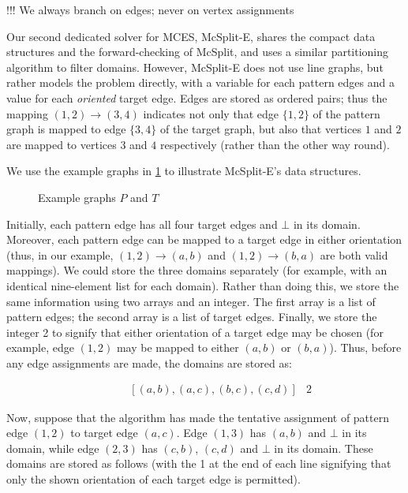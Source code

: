 !!! We always branch on edges; never on vertex assignments

Our second dedicated solver for MCES, McSplit-E, shares the compact data
structures and the forward-checking of McSplit, and uses a similar partitioning
algorithm to filter domains.  However, McSplit-E does not use line graphs, but
rather models the problem directly, with a variable for each pattern edges and a value
for each \textit{oriented} target edge.  Edges are stored as ordered pairs; thus the mapping
$(1,2) \rightarrow (3,4)$ indicates not only that edge $\{1,2\}$ of the pattern graph is
mapped to edge $\{3,4\}$ of the target graph, but also that vertices $1$ and $2$ are mapped
to vertices $3$ and $4$ respectively (rather than the other way round).

We use the example graphs in \cref{fig:splitp-example} to illustrate McSplit-E's data structures.
\begin{figure}[htb]
    \centering
    
    \caption{Example graphs $P$ and $T$}
    \label{fig:splitp-example}
\end{figure}

Initially, each pattern edge has all four
target edges and $\bot$ in its domain.  Moreover, each pattern edge can be mapped to a target edge in either orientation
(thus, in our example, $(1,2) \rightarrow (a,b)$ and $(1,2) \rightarrow (b,a)$ are both valid mappings). 
We could store the three domains separately (for example, with an identical nine-element list for each domain).
Rather than doing this, we store the same
information using two arrays and an integer.  The first array is a list of pattern edges;
the second array is a list of target edges. Finally, we store the integer 2 to signify that either orientation of a
target edge may be chosen (for example, edge $(1,2)$ may be mapped to either $(a,b)$ or $(b,a)$).
Thus, before any edge assignments are made, the domains are stored as:

\begin{align*}
    [(1,2), (1,3), (2,3)] & \qquad [(a,b), (a,c), (b,c), (c,d)] & 2
\end{align*}

Now, suppose that the algorithm has made the tentative assignment of pattern edge $(1,2)$ to target edge $(a,c)$.
Edge $(1,3)$ has $(a,b)$ and $\bot$ in its domain, while edge $(2,3)$ has $(c,b)$, $(c,d)$
and $\bot$ in its domain.  These domains are stored as follows (with the 1 at the end of
each line signifying that only the shown orientation of each target edge is permitted).

